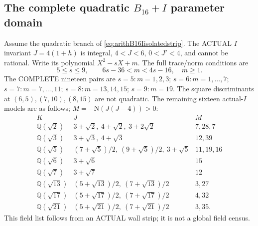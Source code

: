 \documentclass[11pt]{article}
\begin{document}
\subsection[The complete quadratic B16+I parameter domain]{The complete quadratic \(B_{16}+I\) parameter domain}
\label{app:arithB16Iquadratic}

Assume the quadratic branch of
\eqref{eq:arithB16Iisolatedstrip}.
The ACTUAL \(I\) invariant \(J=4(1+h)\)
is integral, \(4<J<6\), \(0<J'<4\),
and cannot be rational.
Write its polynomial \(X^2-sX+m\).
The full trace/norm conditions are
\[
              5\le s\le9,\qquad 6s-36<m<4s-16,\quad m\ge1 .
\]
The COMPLETE nineteen pairs are
\(s=5:m=1,2,3\);
\(s=6:m=1,\ldots,7\);
\(s=7:m=7,\ldots,11\);
\(s=8:m=13,14,15\);
\(s=9:m=19\).
The square discriminants at
\((6,5),(7,10),(8,15)\) are not quadratic.
The remaining sixteen actual-\(I\) models
are as follows; \(M=-\mathrm N(J(J-4))>0\):
\[
\begin{array}{c|l|l}
 K&J&M\\ \hline
 \mathbb Q(\sqrt2)&3+\sqrt2,\ 4+\sqrt2,\ 3+2\sqrt2&7,28,7\\
 \mathbb Q(\sqrt3)&3+\sqrt3,\ 4+\sqrt3&12,39\\
 \mathbb Q(\sqrt5)&(7+\sqrt5)/2,\ (9+\sqrt5)/2,\ 3+\sqrt5&11,19,16\\
 \mathbb Q(\sqrt6)&3+\sqrt6&15\\
 \mathbb Q(\sqrt7)&3+\sqrt7&12\\
 \mathbb Q(\sqrt{13})&(5+\sqrt{13})/2,\ (7+\sqrt{13})/2&3,27\\
 \mathbb Q(\sqrt{17})&(5+\sqrt{17})/2,\ (7+\sqrt{17})/2&4,32\\
 \mathbb Q(\sqrt{21})&(5+\sqrt{21})/2,\ (7+\sqrt{21})/2&3,35 .
\end{array}
\]
This field list follows from an ACTUAL
wall strip; it is not a global field census.
\end{document}
